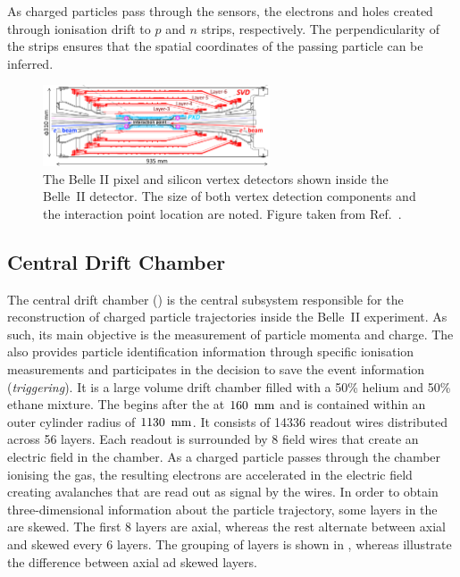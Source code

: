 As charged particles pass through the \SVD sensors, the electrons and holes created through ionisation drift to $p$ and $n$ strips, respectively.
The perpendicularity of the strips ensures that the spatial coordinates of the passing particle can be inferred.

\begin{figure}[htbp!]
    \centering
    \includegraphics[width=0.6\textwidth]{figures/experimental_setup/vxd.png}
    \caption{\label{fig:vxd}
    The Belle II pixel and silicon vertex detectors shown inside the Belle~II detector.
    The size of both vertex detection components and the interaction point location are noted.
    Figure taken from Ref.~\cite{Belle-IISVD:2023mxk}.
    }
\end{figure}

\subsection{Central Drift Chamber}\label{sec:cdc}

The central drift chamber (\CDC) \cite{Taniguchi:2017not} is the central subsystem responsible for the reconstruction of charged particle trajectories inside the Belle~II experiment.
As such, its main objective is the measurement of particle momenta and charge.
The \CDC also provides particle identification information through specific ionisation measurements
and participates in the decision to save the event information (\textit{triggering}).
It is a large volume drift chamber filled with a 50\% helium and 50\% ethane mixture.
The \CDC begins after the \SVD at $160~{\rm \,mm}$ and is contained within an outer cylinder radius of $1130~{\rm \,mm}$.
It consists of 14336 readout wires distributed across 56 layers.
Each readout is surrounded by 8 field wires that create an electric field in the chamber.
As a charged particle passes through the chamber ionising the gas,
the resulting electrons are accelerated in the electric field creating avalanches that are read out as signal by the wires.
In order to obtain three-dimensional information about the particle trajectory,
some layers in the \CDC are skewed.
The first 8 layers are axial, whereas the rest alternate between axial and skewed every 6 layers.
The grouping of layers is shown in , whereas  illustrate the difference between axial ad skewed layers.

